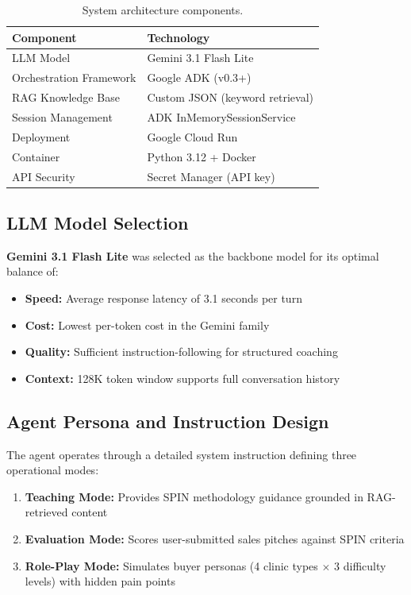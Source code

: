 \documentclass[10pt,twocolumn,a4paper]{article}
\begin{document}
\begin{table}[t]
\caption{System architecture components.}
\label{tab:architecture}
\setlength{\tabcolsep}{36pt}
\renewcommand{\arraystretch}{1.4}
\begin{tabular}{l l}
\toprule
\textbf{Component} & \textbf{Technology} \\
\midrule
LLM Model & Gemini 3.1 Flash Lite \\
Orchestration Framework & Google ADK (v0.3+) \\
RAG Knowledge Base & Custom JSON (keyword retrieval) \\
Session Management & ADK InMemorySessionService \\
Deployment & Google Cloud Run \\
Container & Python 3.12 + Docker \\
API Security & Secret Manager (API key) \\
\bottomrule
\end{tabular}
\end{table}

\subsection{LLM Model Selection}

\textbf{Gemini 3.1 Flash Lite} was selected as the backbone model for its optimal balance of:
\begin{itemize}[leftmargin=*,noitemsep,topsep=2pt]
    \item \textbf{Speed:} Average response latency of 3.1 seconds per turn
    \item \textbf{Cost:} Lowest per-token cost in the Gemini family
    \item \textbf{Quality:} Sufficient instruction-following for structured coaching
    \item \textbf{Context:} 128K token window supports full conversation history
\end{itemize}

\subsection{Agent Persona and Instruction Design}

The agent operates through a detailed system instruction defining three operational modes:

\begin{enumerate}[leftmargin=*,noitemsep,topsep=2pt]
    \item \textbf{Teaching Mode:} Provides SPIN methodology guidance grounded in RAG-retrieved content
    \item \textbf{Evaluation Mode:} Scores user-submitted sales pitches against SPIN criteria
    \item \textbf{Role-Play Mode:} Simulates buyer personas (4 clinic types $\times$ 3 difficulty levels) with hidden pain points
\end{enumerate}
\end{document}
